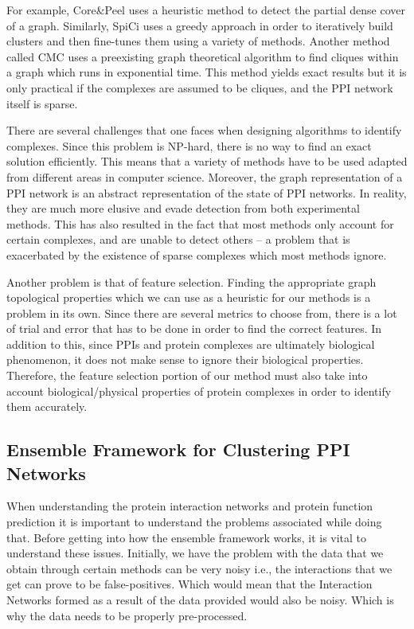 For example, Core\&Peel \cite{pellegrini_detecting_2012} uses a heuristic method to detect the partial dense cover of a graph.
Similarly, SpiCi \cite{jang_spici_2010} uses a greedy approach in order to iteratively build clusters and then fine-tunes 
them using a variety of methods. Another method called CMC uses a preexisting graph theoretical 
algorithm to find cliques within a graph which runs in exponential time. This method yields 
exact results but it is only practical if the complexes are assumed to be cliques, and the 
PPI network itself is sparse.

There are several challenges that one faces when designing algorithms to identify complexes.
Since this problem is NP-hard, there is no way to find an exact solution efficiently. 
This means that a variety of methods have to be used adapted from different areas in 
computer science. Moreover, the graph representation of a PPI network is an abstract 
representation of the state of PPI networks. In reality, they are much more elusive and 
evade detection from both experimental methods. This has also resulted in the fact that 
most methods only account for certain complexes, and are unable to detect others -- 
a problem that is exacerbated by the existence of sparse complexes which most 
methods ignore.

Another problem is that of feature selection. Finding the appropriate graph 
topological properties which we can use as a heuristic for our methods is a problem 
in its own. Since there are several metrics to choose from, there is a lot of 
trial and error that has to be done in order to find the correct features. In addition 
to this, since PPIs and protein complexes are ultimately biological phenomenon, it does 
not make sense to ignore their biological properties. Therefore, the feature selection 
portion of our method must also take into account biological/physical properties \cite{wu_comprehensive_2020} of 
protein complexes in order to identify them accurately.

\subsection{Ensemble Framework for Clustering PPI Networks}\label{sec: ensemble framework}

When understanding the protein interaction networks and protein function prediction it is important to understand the problems associated while doing that. Before getting into how the ensemble framework works, it is vital to understand these issues. Initially, we have the problem with the data that we obtain through certain methods can be very noisy i.e., the interactions that we get can prove to be false-positives. Which would mean that the Interaction Networks formed as a result of the data provided would also be noisy. Which is why the data needs to be properly pre-processed.

